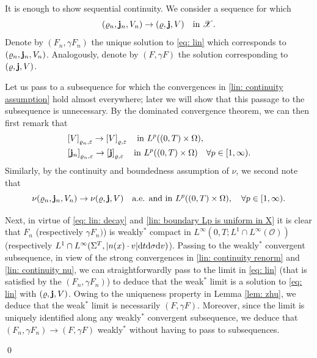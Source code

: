 \documentclass[10pt, reqno]{amsart}
\theoremstyle{plain}
\theoremstyle{definition}
\theoremstyle{remark}
\renewenvironment{proof}[1][\proofname]{\noindent{\scshape #1.\quad}}{\qed}
\numberwithin{equation}{section}
\newcommand{\bfj}{{\bf j}}
\newcommand{\calO}{\mathcal O}
\newcommand{\scrX}{\mathscr X}
\newcommand{\ve}{\varepsilon}
\newcommand{\dv}{\textnormal{d}v}
\newcommand{\dt}{\textnormal{d}t}
\newcommand{\tnd}{\textnormal{d}}
\newcommand{\lt}{\left}
\newcommand{\rt}{\right}
\newcommand{\renorm}[3]{\lt[#1\rt]_{#2 , #3}}
\begin{document}
\begin{proof}
    It is enough to show sequential continuity. We consider a sequence for which
    \begin{equation} \label{lin: continuity assumption}
(\varrho_n, \bfj_n, V_n) \to (\varrho , \bfj, V) \quad \text{in }\scrX.
    \end{equation}
    Denote by $(F_n, \gamma F_n)$ the unique solution to \eqref{eq: lin} which corresponds to $(\varrho_n, \bfj_n, V_n)$. Analogously, denote by $(F, \gamma F)$ the solution corresponding to $(\varrho , \bfj, V)$.

    Let us pass to a subsequence for which the convergences in \eqref{lin: continuity assumption} hold almost everywhere; later we will show that this passage to the subsequence is unnecessary. By the dominated convergence theorem, we can then first remark that
    \begin{equation}\label{lin: continuity renorm}
    \begin{split}
        &\renorm{V}{\varrho_n}{\ve} \to \renorm{V}{\varrho}{\ve} \quad \text{in }L^p((0,T)\times\Omega),\\
        &\renorm{\bfj_n}{\varrho_n}{\ve} \to \renorm{\bfj}{\varrho}{\ve} \quad \text{in }L^p((0,T)\times\Omega) \quad \forall p\in [1,\infty). 
    \end{split}
    \end{equation}
    Similarly, by the continuity and boundedness assumption of $\nu$, we second note that
    \begin{equation}\label{lin: continuity nu}
        \nu(\varrho_n, \bfj_n, V_n) \to \nu(\varrho, \bfj, V) \quad \textnormal{a.e. and in }L^p((0,T)\times\Omega), \quad \forall p\in [1,\infty).
    \end{equation}
    
    Next, in virtue of \eqref{eq: lin: decay} and \eqref{lin: boundary Lp is uniform in X} it is clear that $F_n$ (respectively $\gamma F_n)$) is weakly$^*$ compact in $L^\infty(0,T;L^1\cap L^\infty(\calO))$ (respectively $L^1\cap L^\infty(\Sigma^T, |n(x)\cdot v|\dt\tnd\sigma\dv)$). Passing to the weakly$^*$ convergent subsequence, in view of the strong convergences in \eqref{lin: continuity renorm} and \eqref{lin: continuity nu}, we can straightforwardly pass to the limit in \eqref{eq: lin} (that is satisfied by the $(F_n, \gamma F_n)$) to deduce that the weak$^*$ limit is a solution to \eqref{eq: lin} with $( \varrho, \bfj, V)$. Owing to the uniqueness property in Lemma \ref{lem: zhu}, we deduce that the weak$^*$ limit is necessarily $(F, \gamma F)$. Moreover, since the limit is uniquely identified along any weakly$^*$ convergent subsequence, we deduce that $(F_n, \gamma F_n) \to (F, \gamma F)$ weakly$^*$ without having to pass to subsequences.
    

\end{proof}
\end{document}
